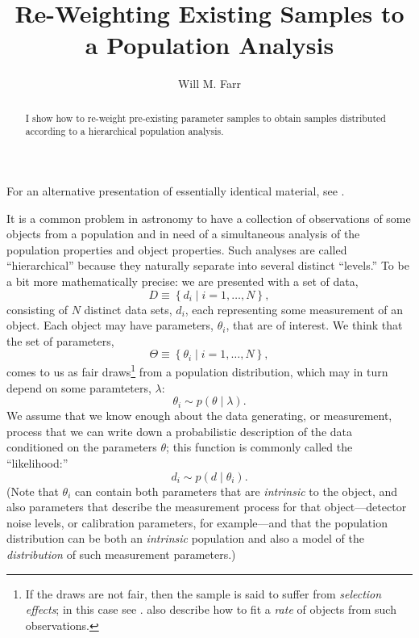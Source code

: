 \documentclass[modern]{aastex63}
\begin{document}
\title{Re-Weighting Existing Samples to a Population Analysis}
\author{Will M. Farr}

\begin{abstract} I show how to re-weight pre-existing parameter samples to
obtain samples distributed according to a hierarchical population analysis.
\end{abstract}

\section*{ }

For an alternative presentation of essentially identical material, see
\citet{Hogg2010}.

It is a common problem in astronomy to have a collection of observations of some
objects from a population and in need of a simultaneous analysis of the
population properties and object properties.  Such analyses are called
``hierarchical'' because they naturally separate into several distinct
``levels.''  To be a bit more mathematically precise: we are presented with a
set of data,
%
\begin{equation}
  D \equiv \left\{ d_i \mid i = 1, \ldots, N \right\},
\end{equation}
%
consisting of $N$ distinct data sets, $d_i$, each representing some measurement
of an object.  Each object may have parameters, $\theta_i$, that are of
interest.  We think that the set of parameters,
%
\begin{equation}
  \Theta \equiv \left\{ \theta_i \mid i = 1, \ldots, N \right\},
\end{equation}
%
comes to us as fair draws\footnote{If the draws are not fair, then the sample is
said to suffer from \emph{selection effects}; in this case see
\citet{Loredo2004,Messenger2013,Mandel2019}.  \citet{Loredo2004,Mandel2019} also
describe how to fit a \emph{rate} of objects from such observations.} from a
population distribution, which may in turn depend on some paramteters,
$\lambda$:
%
\begin{equation}
  \theta_i \sim p\left( \theta \mid \lambda \right).
\end{equation}
%
We assume that we know enough about the data generating, or measurement, process
that we can write down a probabilistic description of the data conditioned on
the parameters $\theta$; this function is commonly called the ``likelihood:''
%
\begin{equation}
  d_i \sim p\left( d \mid \theta_i \right).
\end{equation}
%
(Note that $\theta_i$ can contain both parameters that are \emph{intrinsic} to
the object, and also parameters that describe the measurement process for that
object---detector noise levels, or calibration parameters, for example---and
that the population distribution can be both an \emph{intrinsic} population and
also a model of the \emph{distribution} of such measurement parameters.)
\end{document}

